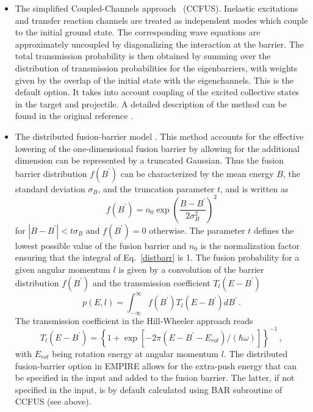 \begin{itemize}
\item The simplified Coupled-Channels approach~\cite{CCFUS} (CCFUS).
Inelastic excitations and transfer reaction channels are treated as
independent modes which couple to the initial ground state. The
corresponding wave equations are approximately uncoupled by diagonalizing
the interaction at the barrier. The total transmission probability is then
obtained by summing over the distribution of transmission probabilities for
the eigenbarriers, with weights given by the overlap of the initial state
with the eigenchannels. This is the default option. It takes into account
coupling of the excited collective states in the target and projectile. A
detailed description of the method can be found in the original reference 
\cite{CCFUS}.

\item The distributed fusion-barrier%
 model \cite{difusb}. This method accounts
for the effective lowering of the one-dimensional fusion barrier by allowing
for the additional dimension can be represented by a truncated Gaussian.
Thus the fusion barrier distribution $f(B^{\prime})$ can be characterized by
the mean energy $B$, the standard deviation $\sigma_{B}$, and the truncation
parameter $t$, and is written as 
\begin{equation}
f(B^{\prime})=n_{0}\exp\left(%
\frac{B-B^{\prime}}{2\sigma_{B}^{2}}\right)^{2}  \label{distbarr}
\end{equation}
\noindent for $\left|B-B^{\prime}\right|<t\sigma_{B}$ and $f(B^{\prime})=0$
otherwise. The parameter $t$ defines the lowest possible value of the fusion
barrier and $n_{0}$ is the normalization factor ensuring that the integral
of Eq.~\ref{distbarr} is 1. The fusion probability for a given angular
momentum $l$ is given by a convolution of the barrier distribution $%
f(B^{\prime})$ and the transmission coefficient $T_{l}(E-B^{\prime})$ 
\begin{equation}
p(E,l)=\int_{-\infty}^{\infty}f(B^{\prime})T_{l}(E-B^{\prime})dB^{\prime}\,.
\end{equation}
\noindent The transmission coefficient in the Hill-Wheeler approach \cite%
{HillWheeler} reads 
\begin{equation}
T_{l}(E-B^{\prime})=\left\{ 1+\exp\left[-2\pi(E-B^{\prime}-E_{rot})/(\hbar%
\omega)\right]\right\} ^{-1}\,,
\end{equation}
\noindent with $E_{rot}$ being rotation energy at angular momentum $l$. The
distributed fusion-barrier option in EMPIRE allows for the extra-push energy
that can be specified in the input and added to the fusion barrier. The
latter, if not specified in the input, is by default calculated using BAR
subroutine of CCFUS (see above).


\end{itemize}

